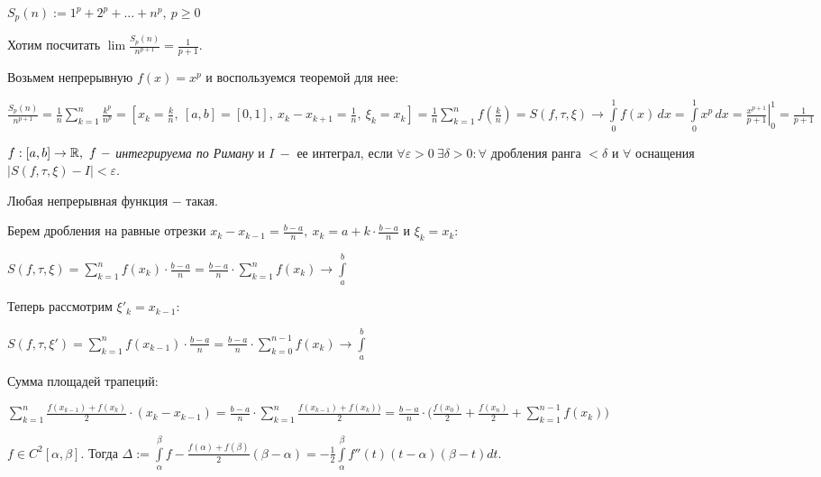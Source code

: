 \begin{example}
    $S_p(n):=1^p+2^p+...+n^p,\ p\geq 0$

    Хотим посчитать $\lim\frac{S_p(n)}{n^{p+1}}=\frac{1}{p+1}$.

    Возьмем непрерывную $f(x)=x^p$ и воспользуемся теоремой для нее:

    $\frac{S_p(n)}{n^{p+1}}=\frac{1}{n}\sum\limits_{k=1}^n \frac{k^p}{n^p}=[x_k=\frac{k}{n},\ [a, b]=[0, 1],\ x_k-x_{k+1}=\frac{1}{n},\ \xi_k=x_k]=\frac{1}{n}\sum\limits_{k=1}^n f(\frac{k}{n})=S(f, \tau, \xi)\rightarrow \int\limits_0^1 f(x)\,dx=\int\limits_0^1 x^p\,dx=\left.\frac{x^{p+1}}{p+1}\right|_0^1=\frac{1}{p+1}$


\end{example}

\begin{definition}
    $f: [a, b]\rightarrow \mathbb{R},\ f\ -$ \textit{интегрируема по Риману} и $I\ -$ ее интеграл, если $\forall \varepsilon >0\ \exists\delta>0:\forall$ дробления ранга $<\delta$ и $\forall$ оснащения $\bigg|S(f,\tau, \xi) - I\bigg|<\varepsilon$.
\end{definition}

\begin{remark}
    Любая непрерывная функция $-$ такая.
\end{remark}

\begin{remark}
    Берем дробления на равные отрезки $x_k-x_{k-1}=\frac{b-a}{n},\ x_k=a+k\cdot \frac{b-a}{n}$ и $\xi_k=x_k$:

    $S(f, \tau, \xi)=\sum\limits_{k=1}^nf(x_k)\cdot\frac{b-a}{n}=\frac{b-a}{n}\cdot \sum\limits_{k=1}^nf(x_k)\rightarrow \int\limits_a^b$

    Теперь рассмотрим $\xi'_k=x_{k-1}:$
    
    $S(f, \tau, \xi')=\sum\limits_{k=1}^nf(x_{k-1})\cdot\frac{b-a}{n}=\frac{b-a}{n}\cdot \sum\limits_{k=0}^{n-1}f(x_k)\rightarrow \int\limits_a^b$

    Сумма площадей трапеций: 
    
    $\sum\limits_{k=1}^n\frac{f(x_{k-1})+f(x_k)}{2}\cdot (x_k-x_{k-1})=\frac{b-a}{n}\cdot \sum\limits_{k=1}^n\frac{f(x_{k-1})+f(x_k))}{2}
    =\frac{b-a}{n}\cdot\bigg(\frac{f(x_0)}{2}+\frac{f(x_n)}{2}+\sum\limits_{k=1}^{n-1}f(x_k)\bigg)$
\end{remark}

\begin{lemma}
    $f\in C^2[\alpha, \beta]$. Тогда $\Delta:=\int\limits_\alpha^\beta f-\frac{f(\alpha)+f(\beta)}{2}(\beta-\alpha)=-\frac{1}{2}\int\limits_\alpha^\beta f''(t)(t-\alpha)(\beta-t)dt$.
\end{lemma}

